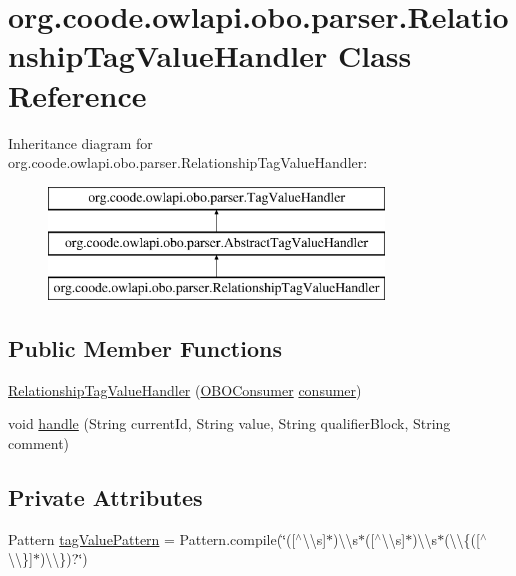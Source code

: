 \hypertarget{classorg_1_1coode_1_1owlapi_1_1obo_1_1parser_1_1_relationship_tag_value_handler}{\section{org.\-coode.\-owlapi.\-obo.\-parser.\-Relationship\-Tag\-Value\-Handler Class Reference}
\label{classorg_1_1coode_1_1owlapi_1_1obo_1_1parser_1_1_relationship_tag_value_handler}
}
Inheritance diagram for org.\-coode.\-owlapi.\-obo.\-parser.\-Relationship\-Tag\-Value\-Handler\-:\begin{figure}[H]
\begin{center}
\leavevmode
\includegraphics[height=3.000000cm]{classorg_1_1coode_1_1owlapi_1_1obo_1_1parser_1_1_relationship_tag_value_handler}
\end{center}
\end{figure}
\subsection*{Public Member Functions}
\begin{DoxyCompactItemize}
\item 
\hyperlink{classorg_1_1coode_1_1owlapi_1_1obo_1_1parser_1_1_relationship_tag_value_handler_af234b35732881a930a35da0956b420ce}{Relationship\-Tag\-Value\-Handler} (\hyperlink{classorg_1_1coode_1_1owlapi_1_1obo_1_1parser_1_1_o_b_o_consumer}{O\-B\-O\-Consumer} \hyperlink{classorg_1_1coode_1_1owlapi_1_1obo_1_1parser_1_1_abstract_tag_value_handler_ab27f1ff22d15640c5f81585f18265137}{consumer})
\item 
void \hyperlink{classorg_1_1coode_1_1owlapi_1_1obo_1_1parser_1_1_relationship_tag_value_handler_ae022ccb8d93671830a4c88935c8a425c}{handle} (String current\-Id, String value, String qualifier\-Block, String comment)
\end{DoxyCompactItemize}
\subsection*{Private Attributes}
\begin{DoxyCompactItemize}
\item 
Pattern \hyperlink{classorg_1_1coode_1_1owlapi_1_1obo_1_1parser_1_1_relationship_tag_value_handler_a5e2dafcc9518a6b68c818c318dcacf65}{tag\-Value\-Pattern} = Pattern.\-compile(\char`\"{}(\mbox{[}$^\wedge$\textbackslash{}\textbackslash{}s\mbox{]}$\ast$)\textbackslash{}\textbackslash{}s$\ast$(\mbox{[}$^\wedge$\textbackslash{}\textbackslash{}s\mbox{]}$\ast$)\textbackslash{}\textbackslash{}s$\ast$(\textbackslash{}\textbackslash{}\{(\mbox{[}$^\wedge$\textbackslash{}\textbackslash{}\}\mbox{]}$\ast$)\textbackslash{}\textbackslash{}\})?\char`\"{})
\end{DoxyCompactItemize}
